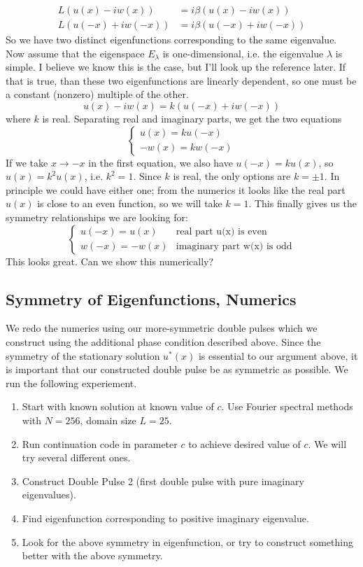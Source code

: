 \documentclass[12pt]{article}
\begin{document}
\begin{align*}
	L( u(x) - i w(x) ) &= i \beta ( u(x) - i w(x) ) \\
	L( u(-x) + i w(-x) ) &= i \beta ( u(-x) + i w(-x) )
\end{align*} 
So we have two distinct eigenfunctions corresponding to the same eigenvalue. Now assume that the eigenspace $E_\lambda$ is one-dimensional, i.e. the eigenvalue $\lambda$ is simple. I believe we know this is the case, but I'll look up the reference later. If that is true, than these two eigenfunctions are linearly dependent, so one must be a constant (nonzero) multiple of the other.
\[
u(x) - i w(x) = k( u(-x) + i w(-x) )
\]
where $k$ is real. Separating real and imaginary parts, we get the two equations
\[ \begin{cases}
u(x) = k u(-x)\\
-w(x) = k w(-x)
\end{cases}\]
If we take $x \rightarrow -x$ in the first equation, we also have $u(-x) = k u(x)$, so $u(x) = k^2 u(x)$, i.e. $k^2 = 1$. Since $k$ is real, the only options are $k = \pm 1$. In principle we could have either one; from the numerics it looks like the real part $u(x)$ is close to an even function, so we will take $k = 1$. This finally gives us the symmetry relationships we are looking for:
\[ \begin{cases}
u(-x) = u(x)&\text{real part u(x) is even}\\
w(-x) = -w(x)&\text{imaginary part w(x) is odd}
\end{cases}\]
This looks great. Can we show this numerically?

\subsection*{Symmetry of Eigenfunctions, Numerics}
We redo the numerics using our more-symmetric double pulses which we construct using the additional phase condition described above. Since the symmetry of the stationary solution $u^*(x)$ is essential to our argument above, it is important that our constructed double pulse be as symmetric as possible. We run the following experiement.
\begin{enumerate}
	\item Start with known solution at known value of $c$. Use Fourier spectral methods with $N = 256$, domain size $L = 25$.
	\item Run continuation code in parameter $c$ to achieve desired value of $c$. We will try several different ones.
	\item Construct Double Pulse 2 (first double pulse with pure imaginary eigenvalues).
	\item Find eigenfunction corresponding to positive imaginary eigenvalue.
	\item Look for the above symmetry in eigenfunction, or try to construct something better with the above symmetry.
\end{enumerate}
\end{document}
